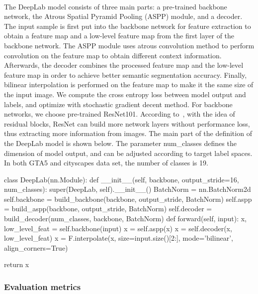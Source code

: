 \paragraph{}
The DeepLab model consists of three main parts: a pre-trained backbone network, the Atrous Spatial Pyramid Pooling (ASPP) module, and a decoder. The input sample is first put into the backbone network for feature extraction to obtain a feature map and a low-level feature map from the first layer of the backbone network. The ASPP module uses atrous convolution method to perform convolution on the feature map to obtain different context information. Afterwards, the decoder combines the processed feature map and the low-level feature map in order to achieve better semantic segmentation accuracy. Finally, bilinear interpolation is performed on the feature map to make it the same size of the input image. We compute the cross entropy loss between model output and labels, and optimize with stochastic gradient decent method.
For backbone networks, we choose pre-trained ResNet101. According to~\cite{2016Deep}, with the idea of residual blocks, ResNet can build more network layers without performance loss, thus extracting more information from images. The main part of the definition of the  DeepLab model is shown below. The parameter num\_classes defines the dimension of model output, and can be adjusted according to target label spaces. In both GTA5 and cityscapes data set, the number of classes is 19.
\begin{python}
class DeepLab(nn.Module):
    def __init__(self, backbone, output_stride=16, num_classes):
        super(DeepLab, self).__init__()
        BatchNorm = nn.BatchNorm2d
        self.backbone = build_backbone(backbone, output_stride, BatchNorm)
        self.aspp = build_aspp(backbone, output_stride, BatchNorm)
        self.decoder = build_decoder(num_classes, backbone, BatchNorm)
    def forward(self, input):
        x, low_level_feat = self.backbone(input)
        x = self.aspp(x)
        x = self.decoder(x, low_level_feat)
        x = F.interpolate(x, size=input.size()[2:], mode='bilinear', align_corners=True)

        return x
\end{python}
\subsubsection{Evaluation metrics}

